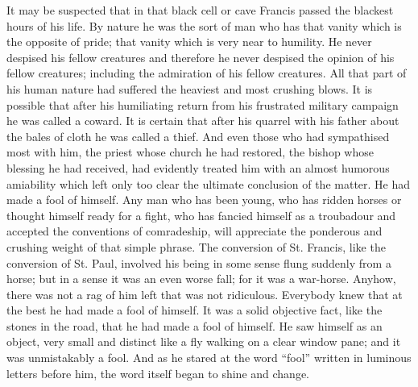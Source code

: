 \documentclass{book}
\begin{document}
It may be suspected that in that black cell or cave Francis passed the blackest hours of his life. By nature he was the sort of man who has that vanity which is the opposite of pride; that vanity which is very near to humility. He never despised his fellow creatures and therefore he never despised the opinion of his fellow creatures; including the admiration of his fellow creatures. All that part of his human nature had suffered the heaviest and most crushing blows. It is possible that after his humiliating return from his frustrated military campaign he was called a coward. It is certain that after his quarrel with his father about the bales of cloth he was called a thief. And even those who had sympathised most with him, the priest whose church he had restored, the bishop whose blessing he had received, had evidently treated him with an almost humorous amiability which left only too clear the ultimate conclusion of the matter. He had made a fool of himself. Any man who has been young, who has ridden horses or thought himself ready for a fight, who has fancied himself as a troubadour and accepted the conventions of comradeship, will appreciate the ponderous and crushing weight of that simple phrase. The conversion of St. Francis, like the conversion of St. Paul, involved his being in some sense flung suddenly from a horse; but in a sense it was an even worse fall; for it was a war-horse. Anyhow, there was not a rag of him left that was not ridiculous. Everybody knew that at the best he had made a fool of himself. It was a solid objective fact, like the stones in the road, that he had made a fool of himself. He saw himself as an object, very small and distinct like a fly walking on a clear window pane; and it was unmistakably a fool. And as he stared at the word “fool” written in luminous letters before him, the word itself began to shine and change.
\end{document}

